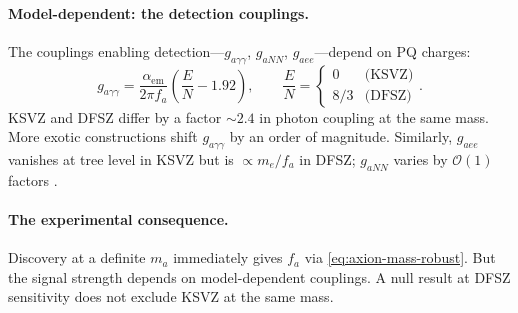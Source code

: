 \paragraph{Model-dependent: the detection couplings.}
The couplings enabling detection---$g_{a\gamma\gamma}$, $g_{aNN}$, $g_{aee}$---depend on PQ charges:
\begin{equation}\label{eq:coupling-model-dependence}
  g_{a\gamma\gamma} = \frac{\alpha_{\mathrm{em}}}{2\pi f_a}\!\left(\frac{E}{N} - 1.92\right), \qquad
  \frac{E}{N} = \begin{cases} 0 & \text{(KSVZ)} \\ 8/3 & \text{(DFSZ)} \end{cases}.
\end{equation}
KSVZ and DFSZ differ by a factor $\sim\!2.4$ in photon coupling at the same mass.  More exotic constructions shift $g_{a\gamma\gamma}$ by an order of magnitude.  Similarly, $g_{aee}$ vanishes at tree level in KSVZ but is $\propto m_e/f_a$ in DFSZ; $g_{aNN}$ varies by $\mathcal{O}(1)$ factors \cite{Marsh2016AxionCosmology}.

\paragraph{The experimental consequence.}
Discovery at a definite $m_a$ immediately gives $f_a$ via \eqref{eq:axion-mass-robust}.  But the signal strength depends on model-dependent couplings.  A null result at DFSZ sensitivity does not exclude KSVZ at the same mass.

\medskip

